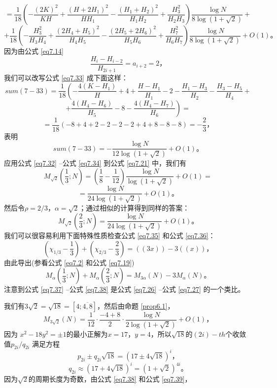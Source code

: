 \documentclass[11pt,a4paper]{article}
\theoremstyle{definition}
\newcommand{\refeq}[1]{公式 \ref{#1}}
\newcommand{\refprop}[1]{命题 \ref{#1}}
\numberwithin{equation}{section}
\newcommand{\comma}{\text{，}}
\newcommand{\juhao}{\text{。}}
\newcommand{\pmone}{\pm1}
\newcommand{\xysolution}[2]{$ x=#1\comma y=#2 $}
\newcommand{\pelleq}[2]{ $ x^{2}-#1y^{2}=#2 $} %
\newcommand{\ddbrace}[1]{\left(\left(#1\right)\right)}
\begin{document}
 \[ =\dfrac{1}{18}\left(-\dfrac{(2K)^{2}}{KH}+\dfrac{(H+2H_{1})^{2}}{HH_{1}}-\dfrac{(H_{1}+H_{2})^{2}}{H_{1}H_{2}}+\dfrac{H_{3}^{2}}{H_{2}H_{3}}\right)\dfrac{\log N}{8\log(1+\sqrt{2})}+ \]
 \begin{equation}\label{eq7.33}
 +\dfrac{1}{18}\left(-\dfrac{H_{3}^{2}}{H_{3}H_{4}}+\dfrac{(2H_{4}+H_{5})^{2}}{H_{4}H_{5}}-\dfrac{(2H_{5}+2H_{6})^{2}}{H_{5}H_{6}}+\dfrac{H_{7}^{2}}{H_{6}H_{7}}\right)\dfrac{\log N}{8\log(1+\sqrt{2})}+O(1)\juhao
 \end{equation}
 因为由\refeq{eq7.14}
 \[ \dfrac{H_{i}-H_{i-2}}{H_{2i+1}}=a_{i+2}=2\comma \]
 我们可以改写\refeq{eq7.33} 成下面这样：
 \[ sum(7-33)=\dfrac{1}{18}\left(-\dfrac{4(K-H_{1})}{H}+4+\dfrac{H-H_{1}}{H_{1}}-2-\dfrac{H_{1}-H_{3}}{H_{2}}-\dfrac{H_{3}-H_{5}}{H_{4}}+\right. \]
 \[ \left.+\dfrac{4(H_{4}-H_{6})}{H_{5}}-8-\dfrac{4(H_{4}-H_{7})}{H_{6}}\right)= \]
 \[ =\dfrac{1}{18}(-8+4+2-2-2-2+4+8-8-8)=-\dfrac{2}{3}\comma \]
 表明
 \begin{equation}\label{eq7.34}
sum(7-33)=-\dfrac{\log N}{12\log(1+\sqrt{2})}+O(1)\juhao
 \end{equation}
 应用\refeq{eq7.32} --\refeq{eq7.34} 到\refeq{eq7.21} 中，我们有
 \[ M_{\sqrt{2}}\left(\dfrac{1}{3};N\right)=\left(\dfrac{1}{8}-\dfrac{1}{12}\right)\dfrac{\log N}{\log(1+\sqrt{2})}+O(1) =\]
 \begin{equation}\label{eq7.35}
 =\dfrac{\log N}{24\log(1+\sqrt{2})}+O(1)\juhao
 \end{equation}
 然后令$ \rho=2/3\comma\alpha=\sqrt{2} $；通过相似的计算得到同样的答案：
 \begin{equation}\label{eq7.36}
 M_{\sqrt{2}}\left(\dfrac{2}{3};N\right)=\dfrac{\log N}{24\log(1+\sqrt{2})}+O(1)\juhao
 \end{equation}
 我们可以很容易利用下面特殊性质检查\refeq{eq7.35} 和\refeq{eq7.36}：
 \begin{equation}\label{eq7.37}
 \left(\chi_{1/3}-\dfrac{1}{3}\right)+ \left(\chi_{2/3}-\dfrac{2}{3}\right)=\ddbrace{3x}-3\ddbrace{x}\comma
 \end{equation}
 由此导出(参看\refeq{eq7.2} 和\refeq{eq7.19})
 \begin{equation}\label{eq7.38}
 M_{\alpha}\left(\dfrac{1}{3};N\right)
+ M_{\alpha}\left(\dfrac{2}{3};N\right)=
M_{3\alpha}\left(N\right)-3M_{\alpha}\left(N\right)\juhao
\end{equation}
 注意到\refeq{eq7.37} --\refeq{eq7.38} 是\refeq{eq7.26} --\refeq{eq7.27} 的一个类比。

我们有$ 3\sqrt{2}=\sqrt{18}=\left[4;\overline{4,8}\right] $，然后由\refprop{prop6.1}，
\begin{equation}\label{eq7.39}
M_{3\sqrt{2}}\left(N\right)=\dfrac{1}{12}\cdot\dfrac{-4+8}{2}\cdot\dfrac{\log N}{2\log(1+\sqrt{2})}+O(1)\comma
\end{equation}  
因为\pelleq{18}{\pmone}的最小正解为\xysolution{17}{4}，所以$ \sqrt{18} $的$ (2i)-th $个收敛值$ p_{2i}/q_{2i} $ 满足方程
\[ p_{2i}\pm q_{2i}\sqrt{18}=\left(17\pm4\sqrt{18}\right)^{i}\comma \]
\[ q_{2i}\approx\left(17+4\sqrt{18}\right)^{i}=(1+\sqrt{2})^{4i}\juhao \]
因为$ \sqrt{2} $的周期长度为奇数，由\refeq{eq7.38} 和\refeq{eq7.39}，
\end{document}
